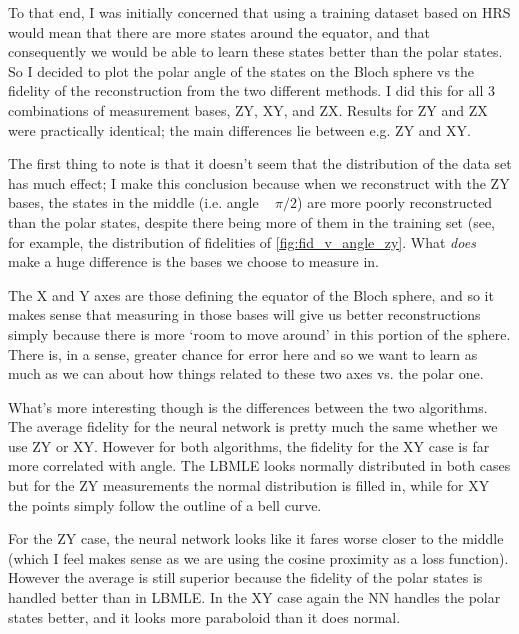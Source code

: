 \documentclass[a4paper,10pt]{article}
\begin{document}
 To that end, I was initially concerned that using a training dataset based on HRS would mean that there are more states around the equator, and that consequently we would be able to learn these states better than the polar states. So I decided to plot the polar angle of the states on the Bloch sphere vs the fidelity of the reconstruction from the two different methods. I did this for all 3 combinations of measurement bases, ZY, XY, and ZX. Results for ZY and ZX were practically identical; the main differences lie between e.g. ZY and XY.
 
 The first thing to note is that it doesn't seem that the distribution of the data set has much effect; I make this conclusion because when we reconstruct with the ZY bases, the states in the middle (i.e. angle ~ $\pi/2$) are more poorly reconstructed than the polar states, despite there being more of them in the training set (see, for example, the distribution of fidelities of \ref{fig:fid_v_angle_zy}. What \emph{does} make a huge difference is the bases we choose to measure in.
 
 The X and Y axes are those defining the equator of the Bloch sphere, and so it makes sense that measuring in those bases will give us better reconstructions simply because there is more `room to move around' in this portion of the sphere. There is, in a sense, greater chance for error here and so we want to learn as much as we can about how things related to these two axes vs. the polar one. 
 
 What's more interesting though is the differences between the two algorithms. The average fidelity for the neural network is pretty much the same whether we use ZY or XY. However for both algorithms, the fidelity for the XY case is far more correlated with angle. The LBMLE looks normally distributed in both cases but for the ZY measurements the normal distribution is filled in, while for XY the points simply follow the outline of a bell curve. 
 
 For the ZY case, the neural network looks like it fares worse closer to the middle (which I feel makes sense as we are using the cosine proximity as a loss function). However the average is still superior because the fidelity of the polar states is handled better than in LBMLE. In the XY case again the NN handles the polar states better, and it looks more paraboloid than it does normal. \\
 
\end{document}
